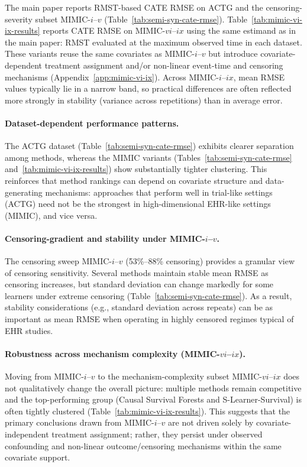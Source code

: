\documentclass{article} %
\begin{document}
The main paper reports RMST-based CATE RMSE on ACTG and the censoring-severity subset MIMIC-$i$--$v$ (Table~\ref{tab:semi-syn-cate-rmse}).
Table~\ref{tab:mimic-vi-ix-results} reports CATE RMSE on MIMIC-$vi$--$ix$ using the same estimand as in the main paper: RMST evaluated at the maximum observed time in each dataset. These variants reuse the same covariates as MIMIC-$i$--$v$ but introduce covariate-dependent treatment assignment and/or non-linear event-time and censoring mechanisms (Appendix~\ref{app:mimic-vi-ix}). Across MIMIC-$i$--$ix$, mean RMSE values typically lie in a narrow band, so practical differences are often reflected more strongly in stability (variance across repetitions) than in average error.

\paragraph{Dataset-dependent performance patterns.}
The ACTG dataset (Table~\ref{tab:semi-syn-cate-rmse}) exhibits clearer separation among methods, whereas the MIMIC variants (Tables~\ref{tab:semi-syn-cate-rmse} and~\ref{tab:mimic-vi-ix-results}) show substantially tighter clustering. This reinforces that method rankings can depend on covariate structure and data-generating mechanisms: approaches that perform well in trial-like settings (ACTG) need not be the strongest in high-dimensional EHR-like settings (MIMIC), and vice versa.

\paragraph{Censoring-gradient and stability under MIMIC-$i$--$v$.}
The censoring sweep MIMIC-$i$--$v$ (53\%--88\% censoring) provides a granular view of censoring sensitivity. Several methods maintain stable mean RMSE as censoring increases, but standard deviation can change markedly for some learners under extreme censoring (Table~\ref{tab:semi-syn-cate-rmse}). As a result, stability considerations (e.g., standard deviation across repeats) can be as important as mean RMSE when operating in highly censored regimes typical of EHR studies.

\paragraph{Robustness across mechanism complexity (MIMIC-$vi$--$ix$).}
Moving from MIMIC-$i$--$v$ to the mechanism-complexity subset MIMIC-$vi$--$ix$ does not qualitatively change the overall picture: multiple methods remain competitive and the top-performing group (Causal Survival Forests and S-Learner-Survival) is often tightly clustered (Table~\ref{tab:mimic-vi-ix-results}). This suggests that the primary conclusions drawn from MIMIC-$i$--$v$ are not driven solely by covariate-independent treatment assignment; rather, they persist under observed confounding and non-linear outcome/censoring mechanisms within the same covariate support.
\end{document}
